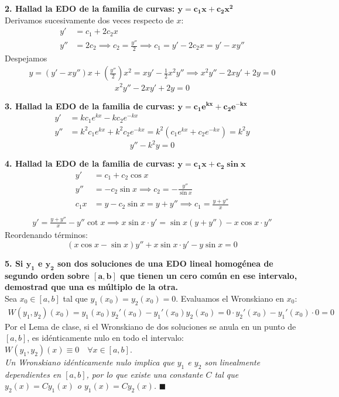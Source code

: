 \documentclass[11pt, a4paper]{article}
\begin{document}
\noindent\textbf{2. Hallad la EDO de la familia de curvas: $\bm{y=c_1 x + c_2 x^2}$} \\
Derivamos sucesivamente dos veces respecto de $x$:
\begin{align*}
y' &= c_1 + 2c_2 x \\
y'' &= 2c_2 \implies c_2 = \frac{y''}{2} \implies c_1 = y' - 2c_2 x = y' - x y''
\end{align*}
Despejamos
\begin{align*}
y = (y' - x y'')x + \left(\frac{y''}{2}\right)x^2 = x y' - \frac{1}{2}x^2 y'' \implies x^2 y'' - 2x y' + 2y = 0
\end{align*}
\[
\boxed{x^2 y'' - 2x y' + 2y = 0}
\]


\noindent\textbf{3. Hallad la EDO de la familia de curvas: $\bm{y=c_1 e^{kx} + c_2 e^{-kx}}$} \\
\begin{align*}
y' &= k c_1 e^{kx} - k c_2 e^{-kx} \\
y'' &= k^2 c_1 e^{kx} + k^2 c_2 e^{-kx} = k^2 (c_1 e^{kx} + c_2 e^{-kx}) = k^2 y
\end{align*}
\[
\boxed{y'' - k^2 y = 0}
\]


\noindent\textbf{4. Hallad la EDO de la familia de curvas: $\bm{y=c_1 x + c_2 \sin x}$} \\
\begin{align*}
y' &= c_1 + c_2 \cos x \\
y'' &= -c_2 \sin x \implies c_2 = -\frac{y''}{\sin x} \\
c_1 x &= y - c_2 \sin x = y + y'' \implies c_1 = \frac{y + y''}{x} \\
\end{align*}
\begin{align*}
y' = \frac{y + y''}{x} - y'' \cot x \implies x \sin x \cdot y' = \sin x (y + y'') - x \cos x \cdot y''
\end{align*}
Reordenando términos:
\[
\boxed{(x \cos x - \sin x) y'' + x \sin x \cdot y' - y \sin x = 0}
\]


\noindent\textbf{5. Si $\bm{y_1}$ e $\bm{y_2}$ son dos soluciones de una EDO lineal homogénea de segundo orden sobre $\bm{[a,b]}$ que tienen un cero común en ese intervalo, demostrad que una es múltiplo de la otra.} \\
Sea $x_0 \in [a,b]$ tal que $y_1(x_0) = y_2(x_0) = 0$. Evaluamos el Wronskiano en $x_0$:
\begin{align*}
W(y_1, y_2)(x_0) = y_1(x_0)y_2'(x_0) - y_1'(x_0)y_2(x_0) = 0 \cdot y_2'(x_0) - y_1'(x_0) \cdot 0 = 0
\end{align*}
Por el Lema de clase, si el Wronskiano de dos soluciones se anula en un punto de $[a,b]$, es idénticamente nulo en todo el intervalo: $W(y_1, y_2)(x) \equiv 0 \quad \forall x \in [a,b]$.\\
\textit{Un Wronskiano idénticamente nulo implica que $y_1$ e $y_2$ son linealmente dependientes en $[a,b]$, por lo que existe una constante $C$ tal que $y_2(x) = C y_1(x)$ o $y_1(x) = C y_2(x)$.} \quad $\blacksquare$\\
\end{document}
